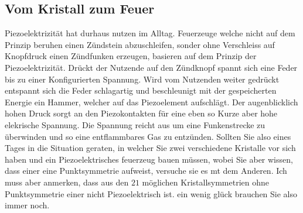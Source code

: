 \subsection{Vom Kristall zum Feuer}
Piezoelektrizität hat durhaus nutzen im Alltag.
Feuerzeuge welche nicht auf dem Prinzip beruhen einen Zündstein abzuschleifen, 
sonder ohne Verschleiss auf Knopfdruck einen Zündfunken erzeugen, basieren auf dem Prinzip der Piezoelektrizität.
Drückt der Nutzende auf den Zündknopf spannt sich eine Feder bis zu einer Konfigurierten Spannung.
Wird vom Nutzenden weiter gedrückt entspannt sich die Feder schlagartig und beschleunigt mit der gespeicherten Energie ein Hammer,
welcher auf das Piezoelement aufschlägt.
Der augenblicklich hohen Druck sorgt an den Piezokontakten für eine eben so Kurze aber hohe elekrische Spannung.
Die Spannung reicht aus um eine Funkenstrecke zu überwinden und so eine entflammbares Gas zu entzünden.
Sollten Sie also eines Tages in die Situation geraten, in welcher Sie zwei verschiedene Kristalle vor sich haben
und ein Piezoelektrisches feuerzeug bauen müssen,
wobei Sie aber wissen, dass einer eine Punktsymmetrie aufweist,
versuche sie es mt dem Anderen.
Ich muss aber anmerken, dass aus den $21$ möglichen Kristallsymmetrien ohne Punktsymmetrie einer nicht Piezoelektrisch ist.
ein wenig glück brauchen Sie also immer noch.